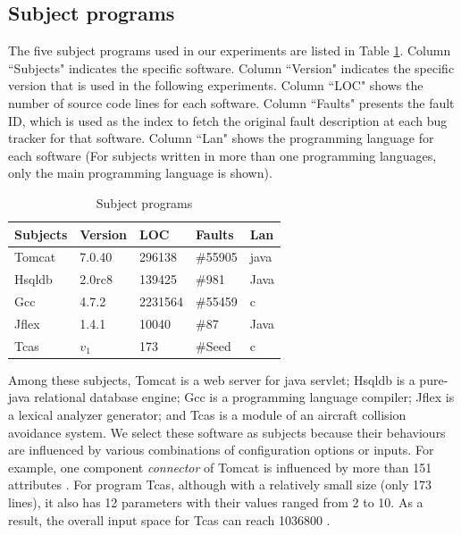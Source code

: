 \documentclass{sig-alternate}
\begin{document}
\subsection{Subject programs}
The five subject programs used in our experiments are listed in Table \ref{subject}. Column ``Subjects" indicates the specific software. Column ``Version" indicates the specific version that is used in the following experiments. Column ``LOC" shows the number of source code lines for each software. Column ``Faults" presents the fault ID, which is used as the index to fetch the original fault description at each bug tracker for that software. Column ``Lan" shows the programming language for each software (For subjects written in more than one programming languages, only the main programming language is shown).

\begin{table}[ht]
\caption{Subject programs}
\label{subject}
\center
\begin{tabular}{l|l|l|l|l}
\hline
Subjects & Version & LOC & Faults &  Lan \\
\hline
Tomcat   &   7.0.40      & 296138    &   \#55905   & java  \\
Hsqldb   &   2.0rc8  &   139425   &    \#981     & Java \\
Gcc      &   4.7.2      &  2231564   & \#55459       &  c\\
Jflex    &    1.4.1     & 10040    &    \#87    & Java \\
Tcas     & $v_{1}$     &   173  &    \#Seed  & c \\ \hline
\end{tabular}

\end{table}

Among these subjects, Tomcat is a web server for java servlet; Hsqldb is a pure-java relational database engine; Gcc is a programming language compiler; Jflex is a lexical analyzer generator; and Tcas is a module of an aircraft collision avoidance system. We select these software as subjects because their behaviours are influenced by various combinations of configuration options or inputs. For example, one component \emph{connector} of Tomcat is influenced by more than 151 attributes \cite{tomcatconnector}. For program Tcas, although with a relatively small size (only 173 lines), it also has 12 parameters with their values ranged from 2 to 10. As a result, the overall input space for Tcas can reach 1036800 \cite{shakya2012isolating,kuhn2006pseudo}.
\end{document}

